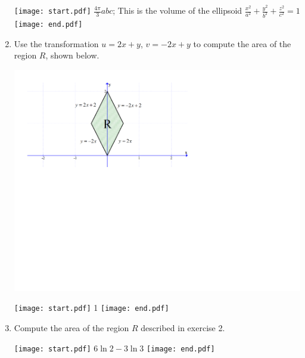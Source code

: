 \documentclass[12pt]{article}
\begin{document}
\begin{enumerate}
\texttt{[image: start.pdf]}
{{$\frac{4\pi}{3}abc$; This is the volume of the ellipsoid  $\frac{x^2}{a^2}+\frac{y^2}{b^2}+\frac{z^2}{c^2} = 1$}}
\texttt{[image: end.pdf]}


\newpage

\item Use the transformation $u=2x+y$, $v=-2x+y$ to compute the area of the region $R$, shown below.

\begin{center}
\includegraphics[scale=0.6]{region4.pdf}
\end{center}

\texttt{[image: start.pdf]}
{{1}}
\texttt{[image: end.pdf]}


\item Compute the area of the region $R$ described in exercise 2.

\texttt{[image: start.pdf]}
{{$6\ln{2}-3\ln{3}$}}
\texttt{[image: end.pdf]}


\end{enumerate}
\end{document}
